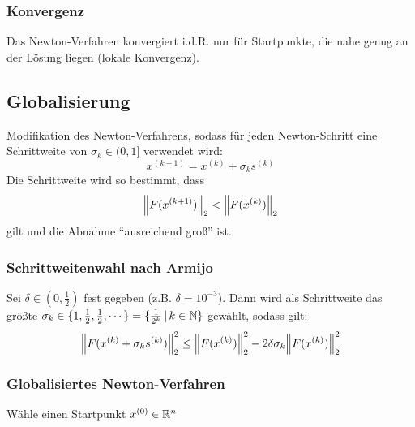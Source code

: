 			\subsubsection{Konvergenz}
				Das Newton-Verfahren konvergiert i.d.R. nur für Startpunkte, die nahe genug an der Lösung liegen (lokale Konvergenz).

		\subsection{Globalisierung}
			Modifikation des Newton-Verfahrens, sodass für jeden Newton-Schritt eine Schrittweite von \( \sigma_k \in (0, 1] \) verwendet wird:
			\begin{equation*}
				x^{(k + 1)} = x^{(k)} + \sigma_k s^{(k)}
			\end{equation*}
			Die Schrittweite wird so bestimmt, dass \[ \norm{F(x^{(k+1)})}_2 < \norm{F(x^{(k)})}_2 \] gilt und die Abnahme \enquote{ausreichend groß} ist.

			\subsubsection{Schrittweitenwahl nach Armijo}
				Sei \( \delta \in (0, \frac{1}{2}) \) fest gegeben (z.B. \( \delta = 10^{-3} \)). Dann wird als Schrittweite das größte \( \sigma_k \in \{ 1, \frac{1}{2}, \frac{1}{2}, \cdots \} = \{ \frac{1}{2^k} \,\vert\, k \in \mathbb{N} \} \) gewählt, sodass gilt:
				\begin{equation*}
					\norm{F(x^{(k)} + \sigma_k s^{(k)})}_2^2 \leq \norm{F(x^{(k)})}_2^2 - 2 \delta \sigma_k \norm{F(x^{(k)})}_2^2
				\end{equation*}

			\subsubsection{Globalisiertes Newton-Verfahren}
				\begin{algorithm}[H]
					\SetAlgoLined
					Wähle einen Startpunkt \( x^{(0)} \in \mathbb{R}^n \) \\
				\end{algorithm}

